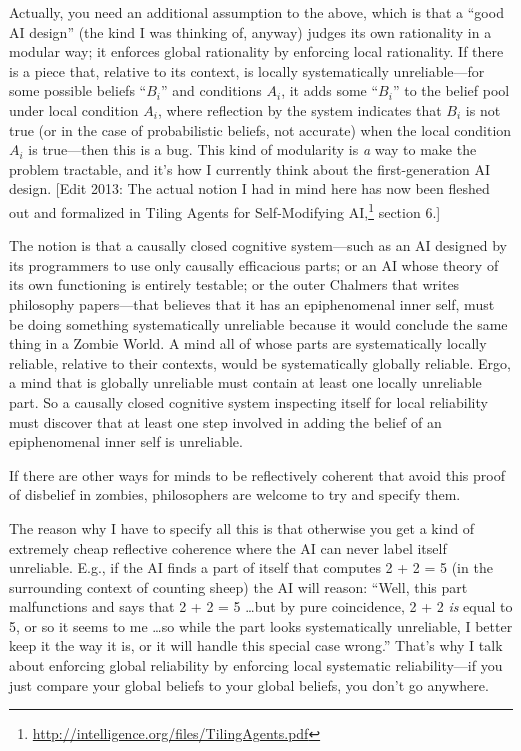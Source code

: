 {
 Actually, you need an additional assumption to the above, which is
that a ``good AI design'' (the kind
I was thinking of, anyway) judges its own rationality in a modular way;
it enforces global rationality by enforcing local rationality. If there
is a piece that, relative to its context, is locally systematically
unreliable---for some possible beliefs
``$B_{i}$'' and
conditions $A_{i}$, it adds some
``$B_{i}$'' to the belief
pool under local condition $A_{i}$, where reflection by the
system indicates that $B_{i}$ is not true (or in the case of
probabilistic beliefs, not accurate) when the local condition
$A_{i}$ is true---then this is a bug. This kind of
modularity is \textit{a} way to make the problem tractable, and
it's how I currently think about the first-generation
AI design. [Edit 2013: The actual notion I had in mind here has now
been fleshed out and formalized in Tiling Agents for Self-Modifying AI,\footnote{\url{http://intelligence.org/files/TilingAgents.pdf}}
section 6.]}

{
 The notion is that a causally closed cognitive system---such as an
AI designed by its programmers to use only causally efficacious parts;
or an AI whose theory of its own functioning is entirely testable; or
the outer Chalmers that writes philosophy papers---that believes that
it has an epiphenomenal inner self, must be doing something
systematically unreliable because it would conclude the same thing in a
Zombie World. A mind all of whose parts are systematically locally
reliable, relative to their contexts, would be systematically globally
reliable. Ergo, a mind that is globally unreliable must contain at
least one locally unreliable part. So a causally closed cognitive
system inspecting itself for local reliability must discover that at
least one step involved in adding the belief of an epiphenomenal inner
self is unreliable.}

{
 If there are other ways for minds to be reflectively coherent that
avoid this proof of disbelief in zombies, philosophers are welcome to
try and specify them.}

{
 The reason why I have to specify all this is that otherwise you
get a kind of extremely cheap reflective coherence where the AI can
never label itself unreliable. E.g., if the AI finds a part of itself
that computes 2 + 2 = 5 (in the surrounding context of counting sheep)
the AI will reason: ``Well, this part malfunctions and
says that 2 + 2 = 5 \ldots but by pure coincidence, 2 + 2 \textit{is}
equal to 5, or so it seems to me \ldots so while the part looks
systematically unreliable, I better keep it the way it is, or it will
handle this special case wrong.''
That's why I talk about enforcing global reliability by
enforcing local systematic reliability---if you just compare your
global beliefs to your global beliefs, you don't go
anywhere.}


